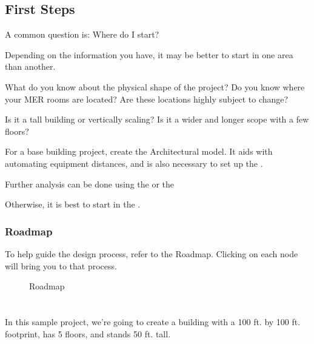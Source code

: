 \documentclass[letterpaper,10pt,english]{sphinxmanual}
\begin{document}
\subsection{First Steps}
\label{\detokenize{docs/tutorial/index-tutorial:first-steps}}
A common question is: Where do I start?

Depending on the information you have, it may be better to start in one area than another.

What do you know about the physical shape of the project?  Do you know where your MER rooms are located?  Are these locations highly subject to change?

Is it a tall building or vertically scaling?  Is it a wider and longer scope with a few floors?

For a base building project, create the Architectural model.  It aids with automating equipment distances, and is also necessary to set up the {\hyperref[\detokenize{docs/userguide/buildingelectricalmodel/riser/index-riser:riser}]{}}.

Further analysis can be done using the {\hyperref[\detokenize{docs/userguide/buildingelectricalmodel/one-line/index-one-line:one-line}]{}} or the {\hyperref[\detokenize{docs/userguide/buildingelectricalmodel/schedules/index-schedules:schedules}]{}}

Otherwise, it is best to start in the {\hyperref[\detokenize{docs/userguide/buildingelectricalmodel/riser/index-riser:riser}]{}}.


\subsubsection{Roadmap}
\label{\detokenize{docs/tutorial/index-tutorial:roadmap}}\label{\detokenize{docs/tutorial/index-tutorial:id1}}
To help guide the design process, refer to the Roadmap.  Clicking on each node will bring you to that process.

\begin{figure}[H]
\centering
\capstart

\noindent{}
\caption{Roadmap}\label{\detokenize{docs/tutorial/index-tutorial:id4}}\end{figure}


\section{}
\label{\detokenize{docs/tutorial/index-tutorial:creating-the-architectural-model}}
In this sample project, we’re going to create a building with a 100 ft. by 100 ft. footprint, has 5 floors, and stands 50 ft. tall.
\end{document}
